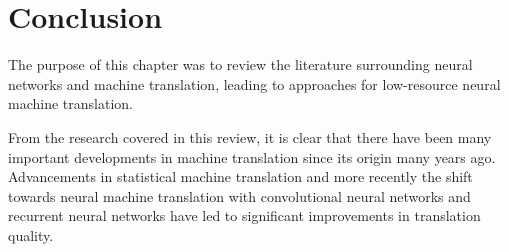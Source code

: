 \begin{table}[!h]
\end{table}

\section{Conclusion}

The purpose of this chapter was to review the literature surrounding neural networks and machine translation, leading to approaches for low-resource neural machine translation. 

From the research covered in this review, it is clear that there have been many important developments in machine translation since its origin many years ago. Advancements in statistical machine translation and more recently the shift towards neural machine translation with convolutional neural networks and recurrent neural networks have led to significant improvements in translation quality.

